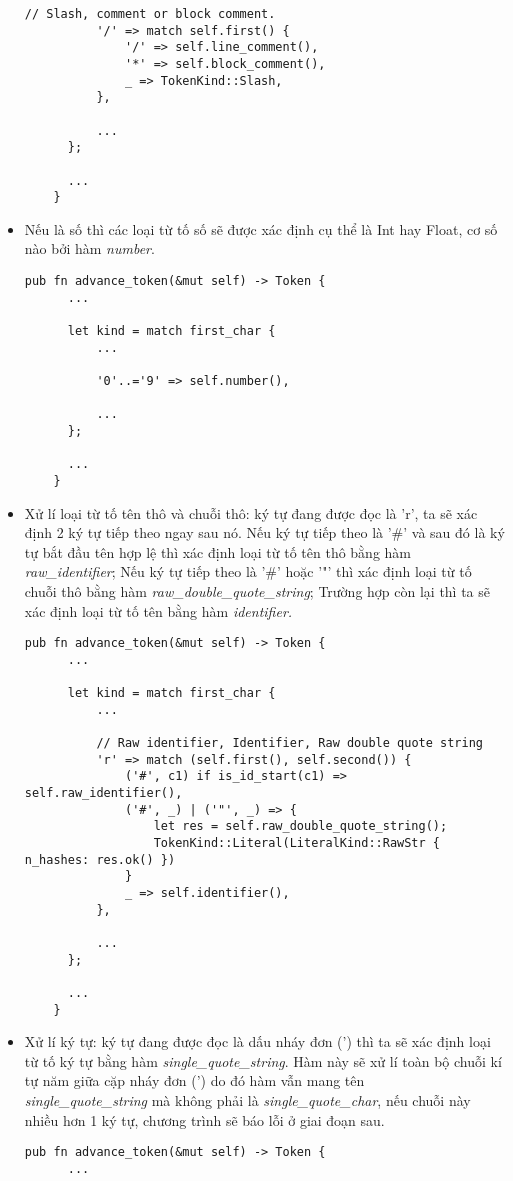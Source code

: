 \begin{itemize}
\begin{lstlisting}[]
          // Slash, comment or block comment.
          '/' => match self.first() {
              '/' => self.line_comment(),
              '*' => self.block_comment(),
              _ => TokenKind::Slash,
          },
  
          ...
      };
  
      ...
    } 
  \end{lstlisting}
  \item Nếu là số thì các loại từ tố số sẽ được xác định cụ thể là Int hay Float, cơ số nào bởi hàm \textit{number}.
  \begin{lstlisting}[]
    pub fn advance_token(&mut self) -> Token {
      ...
  
      let kind = match first_char {
          ...
  
          '0'..='9' => self.number(),
  
          ...
      };
  
      ...
    } 
  \end{lstlisting}
  \item Xử lí loại từ tố tên thô và chuỗi thô: ký tự đang được đọc là 'r', ta sẽ xác định 2 ký tự tiếp theo ngay sau nó. Nếu ký tự tiếp theo là '\#' và sau đó là ký tự bắt đầu tên hợp lệ thì xác định loại từ tố tên thô bằng hàm \textit{raw\_identifier}; Nếu ký tự tiếp theo là '\#' hoặc '"' thì xác định loại từ tố chuỗi thô bằng hàm \textit{raw\_double\_quote\_string}; Trường hợp còn lại thì ta sẽ xác định loại từ tố tên bằng hàm \textit{identifier.}
  \begin{lstlisting}[]
    pub fn advance_token(&mut self) -> Token {
      ...
  
      let kind = match first_char {
          ...
  
          // Raw identifier, Identifier, Raw double quote string
          'r' => match (self.first(), self.second()) {
              ('#', c1) if is_id_start(c1) => self.raw_identifier(),
              ('#', _) | ('"', _) => {
                  let res = self.raw_double_quote_string();
                  TokenKind::Literal(LiteralKind::RawStr { n_hashes: res.ok() })
              }
              _ => self.identifier(),
          },

          ...
      };
  
      ...
    } 
  \end{lstlisting}
  \item Xử lí ký tự: ký tự đang được đọc là dấu nháy đơn (') thì ta sẽ xác định loại từ tố ký tự bằng hàm \textit{single\_quote\_string}. Hàm này sẽ xử lí toàn bộ chuỗi kí tự năm giữa cặp nháy đơn (') do đó hàm vẫn mang tên \\\textit{single\_quote\_string} mà không phải là \textit{single\_quote\_char}, nếu chuỗi này nhiều hơn 1 ký tự, chương trình sẽ báo lỗi ở giai đoạn sau.
  \begin{lstlisting}[]
    pub fn advance_token(&mut self) -> Token {
      ...
  

\end{lstlisting}
\end{itemize}
